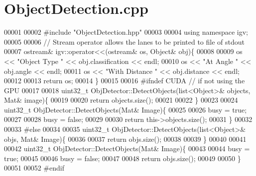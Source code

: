 \hypertarget{ObjectDetection_8cpp_source}{}\section{Object\+Detection.\+cpp}
\label{ObjectDetection_8cpp_source}

\begin{DoxyCode}
00001 
00002 \textcolor{preprocessor}{#}\textcolor{preprocessor}{include} \textcolor{preprocessor}{"ObjectDetection.hpp"}
00003 
00004 \textcolor{keyword}{using} \textcolor{keyword}{namespace} igv;
00005 
00006 \textcolor{comment}{// Stream operator allows the lanes to be printed to file of stdout}
00007 ostream& igv::operator<<(ostream& os, Object& obj)\{
00008 
00009     os << \textcolor{stringliteral}{"Object Type "} << obj.classification << endl;
00010     os << \textcolor{stringliteral}{"At Angle "} << obj.angle << endl;
00011     os << \textcolor{stringliteral}{"With Distance "} << obj.distance << endl;
00012 
00013     \textcolor{keywordflow}{return} os;
00014 \}
00015 
00016 \textcolor{preprocessor}{#}\textcolor{preprocessor}{ifndef} \textcolor{preprocessor}{CUDA}  \textcolor{comment}{// if not using the GPU}
00017 
00018 uint32\_t ObjDetector::DetectObjects(list<Object>& objects, Mat& image)\{
00019 
00020     \textcolor{keywordflow}{return} objects.size();
00021 
00022 \}
00023 
00024 uint32\_t ObjDetector::DetectObjects(Mat& Image)\{
00025 
00026     busy = \textcolor{keyword}{true};
00027 
00028     busy = \textcolor{keyword}{false};
00029 
00030     \textcolor{keywordflow}{return} \textcolor{keyword}{this}->objects.size();
00031 \}
00032 
00033 \textcolor{preprocessor}{#}\textcolor{preprocessor}{else}
00034 
00035 uint32\_t ObjDetector::DetectObjects(list<Object>& objs, Mat& Image)\{
00036 
00037     \textcolor{keywordflow}{return} objs.size();
00038 
00039 \}
00040 
00041 
00042 uint32\_t ObjDetector::DetectObjects(Mat& Image)\{
00043 
00044     busy = \textcolor{keyword}{true};
00045 
00046     busy = \textcolor{keyword}{false};
00047 
00048     \textcolor{keywordflow}{return} objs.size();
00049 
00050 \}
00051 
00052 \textcolor{preprocessor}{#}\textcolor{preprocessor}{endif}
\end{DoxyCode}
